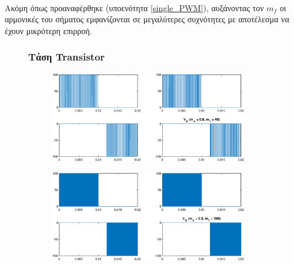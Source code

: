 \noindent\\
 Ακόμη όπως προαναφέρθηκε (υποενότητα \ref{single_PWM}), αυξάνοντας τον $m_f$ οι αρμονικές του σήματος εμφανίζονται σε μεγαλύτερες συχνότητες με αποτέλεσμα να έχουν μικρότερη επιρροή.\\

\begin{figure}[h!]
	\subsubsection*{Τάση Transistor}
		\begin{subfigure}{0.49\textwidth}
		\centering
		\includegraphics[width=0.95\textwidth]{Images/V_Q_40}
	\end{subfigure}
	\begin{subfigure}{0.49\textwidth}
		\centering
		\includegraphics[width=0.95\textwidth]{Images/V_Q_200}
	\end{subfigure}
\end{figure}

